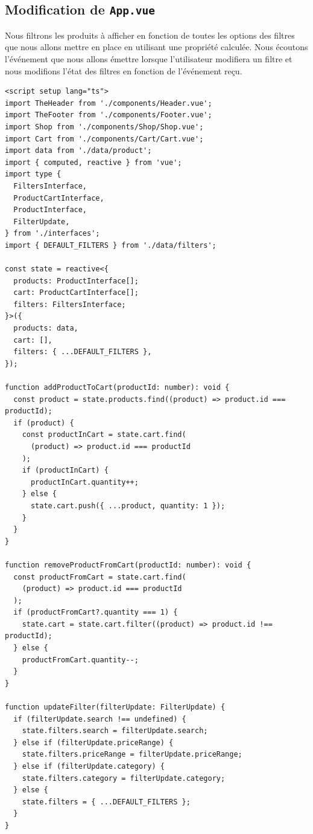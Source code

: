 \subsection{Modification de {\tt App.vue}}
Nous filtrons les produits à afficher en fonction de toutes les options des filtres que nous allons mettre en place en utilisant une propriété calculée. Nous écoutons l'événement que nous allons émettre lorsque l'utilisateur modifiera un filtre et nous modifions l'état des filtres en fonction de l'événement reçu.
\begin{verbatim}
<script setup lang="ts">
import TheHeader from './components/Header.vue';
import TheFooter from './components/Footer.vue';
import Shop from './components/Shop/Shop.vue';
import Cart from './components/Cart/Cart.vue';
import data from './data/product';
import { computed, reactive } from 'vue';
import type {
  FiltersInterface,
  ProductCartInterface,
  ProductInterface,
  FilterUpdate,
} from './interfaces';
import { DEFAULT_FILTERS } from './data/filters';

const state = reactive<{
  products: ProductInterface[];
  cart: ProductCartInterface[];
  filters: FiltersInterface;
}>({
  products: data,
  cart: [],
  filters: { ...DEFAULT_FILTERS },
});

function addProductToCart(productId: number): void {
  const product = state.products.find((product) => product.id === productId);
  if (product) {
    const productInCart = state.cart.find(
      (product) => product.id === productId
    );
    if (productInCart) {
      productInCart.quantity++;
    } else {
      state.cart.push({ ...product, quantity: 1 });
    }
  }
}

function removeProductFromCart(productId: number): void {
  const productFromCart = state.cart.find(
    (product) => product.id === productId
  );
  if (productFromCart?.quantity === 1) {
    state.cart = state.cart.filter((product) => product.id !== productId);
  } else {
    productFromCart.quantity--;
  }
}

function updateFilter(filterUpdate: FilterUpdate) {
  if (filterUpdate.search !== undefined) {
    state.filters.search = filterUpdate.search;
  } else if (filterUpdate.priceRange) {
    state.filters.priceRange = filterUpdate.priceRange;
  } else if (filterUpdate.category) {
    state.filters.category = filterUpdate.category;
  } else {
    state.filters = { ...DEFAULT_FILTERS };
  }
}


\end{verbatim}
